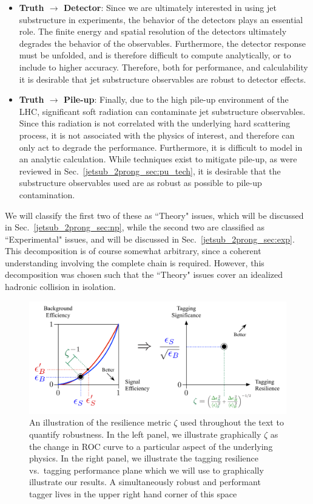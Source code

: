 \documentclass[11pt]{cernrep}
\begin{document}
\begin{itemize}
%
\item {\bf Truth $\to$ Detector}: Since we are ultimately interested in using jet substructure in experiments, the behavior of the detectors plays an essential role.
%
The finite energy and spatial resolution of the detectors ultimately degrades the behavior of the observables.
%
Furthermore, the detector response must be unfolded, and is therefore difficult to compute analytically, or to include to higher accuracy. Therefore, both for performance, and calculability it is desirable that jet substructure observables are robust to detector effects.
%
\item {\bf Truth $\to$ Pile-up}: Finally, due to the high pile-up environment of the LHC, significant soft radiation can contaminate jet substructure observables.
%
Since this radiation is not correlated with the underlying hard scattering process, it is not associated with the physics of interest, and therefore can only act to degrade the performance.
%
Furthermore, it is difficult to model in an analytic calculation.
%
While techniques exist to mitigate pile-up, as were reviewed in Sec.~\ref{jetsub_2prong_sec:pu_tech}, it is desirable that the substructure observables used are as robust as possible to pile-up contamination.
%
\end{itemize}
%
We will classify the first two of these as ``Theory" issues, which will be discussed in Sec.~\ref{jetsub_2prong_sec:np}, while the second two are classified as ``Experimental" issues, and will be discussed in Sec.~\ref{jetsub_2prong_sec:exp}. This decomposition is of course somewhat arbitrary, since a coherent understanding involving the complete chain is required. However, this decomposition was chosen such that the ``Theory" issues cover an idealized hadronic collision in isolation. 

\begin{figure}[t]
\begin{center}
\includegraphics[width=1.0\columnwidth]{jetsub_2prong_roc_to_significance}
\end{center}
\caption{An illustration of the resilience metric $\zeta$ used throughout the text to quantify robustness. In the left panel, we illustrate graphically $\zeta$ as the change in ROC curve to a particular aspect of the underlying physics. In the right panel, we illustrate the tagging resilience vs.\ tagging performance plane which we will use to graphically illustrate our results.  A simultaneously robust and performant tagger lives in the upper right hand corner of this space}
\label{jetsub_2prong_fig:zeta_def}
\end{figure}
\end{document}
